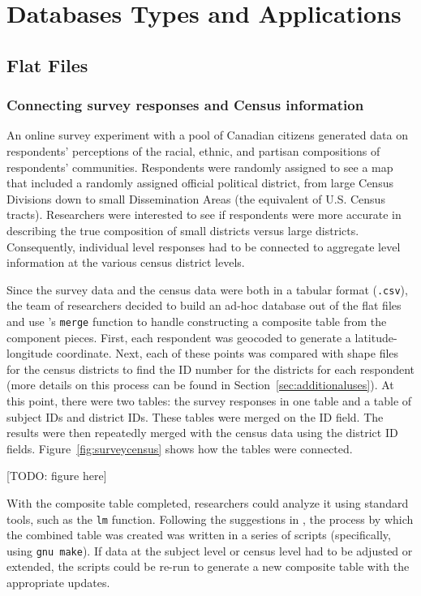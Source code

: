 \documentclass[]{article}
\begin{document}
\section{Databases Types and Applications}

\subsection{Flat Files}

\subsubsection{Connecting survey responses and Census information}
\label{sec:surveycensus}

An online survey experiment with a pool of Canadian citizens
generated data on respondents' perceptions of the racial, ethnic, and partisan
compositions of respondents' communities. Respondents were randomly assigned
to see a map that included a randomly assigned official political district,
from large Census Divisions down to small Dissemination Areas (the equivalent
of U.S. Census tracts). Researchers were interested to see if respondents were
more accurate in describing the true composition of small districts versus
large districts. Consequently, individual level responses had to be connected
to aggregate level information at the various census district levels.

Since the survey data and the census
data were both in a tabular format (\texttt{.csv}), the team of researchers
decided to build an ad-hoc database out of the flat files and use \R's
\texttt{merge} function to handle constructing a composite table from the
component pieces. First, each respondent was geocoded to generate a
latitude-longitude coordinate. Next, each of these points was compared with
shape files for the census districts to find the ID number for the districts
for each respondent (more details on this process can be found in
Section~\ref{sec:additionaluses}). At this point, there were two tables: the
survey responses in one table and a table of subject IDs and district IDs.
These tables were merged on the ID field. The results were then repeatedly
merged with the census data using the district ID fields.
Figure~\ref{fig:surveycensus} shows how the tables were connected.

[TODO: figure here]

With the composite table completed, researchers could analyze it using
standard \R tools, such as the \texttt{lm} function. Following the suggestions
in \citet{Fredrickson:2010fk}, the process by which the combined table was
created was written in a series of scripts (specifically, using \texttt{gnu
make}). If data at the subject level or census level had to be adjusted or
extended, the scripts could be re-run to generate a new composite table with
the appropriate updates.
\end{document}

